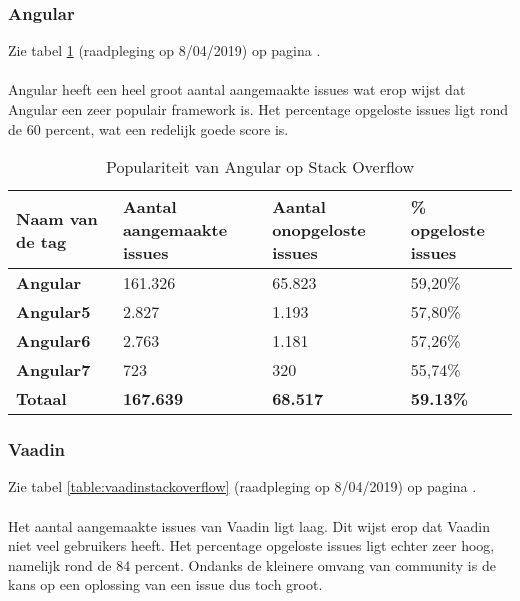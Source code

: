 \subsubsection{Angular}
Zie tabel \ref{table:angularstackoverflow} (raadpleging op 8/04/2019) op pagina \pageref{table:angularstackoverflow}. \\ \\
Angular heeft een heel groot aantal aangemaakte issues wat erop wijst dat Angular een zeer populair framework is. Het percentage opgeloste issues ligt rond de 60 percent, wat een redelijk goede score is.
\begin{table}[H]
	\begin{tabular}{|l|l|l|l|}
		\hline
		Naam van de tag   & \textbf{Aantal aangemaakte issues} & \textbf{Aantal onopgeloste issues} & \textbf{\% opgeloste issues} \\ \hline
		\textbf{Angular}  & 161.326                            & 65.823                             & 59,20\%                              \\ \hline
		\textbf{Angular5} & 2.827                              & 1.193                              & 57,80\%                              \\ \hline
		\textbf{Angular6} & 2.763                              & 1.181                              & 57,26\%                              \\ \hline
		\textbf{Angular7} & 723                                & 320                                & 55,74\%                              \\ \hline
		\textbf{Totaal}   & \textbf{167.639}                   & \textbf{68.517}                    & \textbf{59.13\%}                     \\ \hline
	\end{tabular}
	\caption{Populariteit van Angular op Stack Overflow}
	\label{table:angularstackoverflow}
\end{table}
\subsubsection{Vaadin}
Zie tabel \ref{table:vaadinstackoverflow} (raadpleging op 8/04/2019) op pagina \pageref{table:vaadinstackoverflow}. \\ \\
Het aantal aangemaakte issues van Vaadin ligt laag. Dit wijst erop dat Vaadin niet veel gebruikers heeft. Het percentage opgeloste issues ligt echter zeer hoog, namelijk rond de 84 percent. Ondanks de kleinere omvang van community is de kans op een oplossing van een issue dus toch groot. \\

